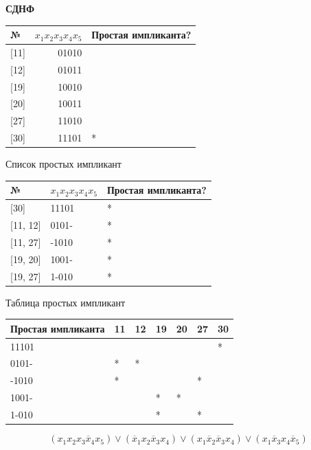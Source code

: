 \textbf{СДНФ}

\begin{longtable}[]{@{}lrl@{}}
\toprule
№ & \(x_1x_2x_3x_4x_5\) & Простая импликанта?\tabularnewline
\midrule
\endhead
{[}11{]} & 01010 &\tabularnewline
{[}12{]} & 01011 &\tabularnewline
{[}19{]} & 10010 &\tabularnewline
{[}20{]} & 10011 &\tabularnewline
{[}27{]} & 11010 &\tabularnewline
{[}30{]} & 11101 & *\tabularnewline
\bottomrule
\end{longtable}

Список простых импликант

\begin{longtable}[]{@{}lll@{}}
\toprule
№ & \(x_1x_2x_3x_4x_5\) & Простая импликанта?\tabularnewline
\midrule
\endhead
{[}30{]} & 11101 & *\tabularnewline
{[}11, 12{]} & 0101- & *\tabularnewline
{[}11, 27{]} & -1010 & *\tabularnewline
{[}19, 20{]} & 1001- & *\tabularnewline
{[}19, 27{]} & 1-010 & *\tabularnewline
\bottomrule
\end{longtable}

Таблица простых импликант

\begin{longtable}[]{@{}lllllll@{}}
\toprule
Простая импликанта & 11 & 12 & 19 & 20 & 27 & 30\tabularnewline
\midrule
\endhead
11101 & & & & & & *\tabularnewline
0101- & * & * & & & &\tabularnewline
-1010 & * & & & & * &\tabularnewline
1001- & & & * & * & &\tabularnewline
1-010 & & & * & & * &\tabularnewline
\bottomrule
\end{longtable}

\[( x_1x_2x_3\overline x_4x_5 ) \lor ( \overline x_1x_2\overline x_3x_4 )  \lor ( x_1\overline x_2\overline x_3x_4 ) \lor ( x_1\overline x_3x_4\overline x_5 )\]

